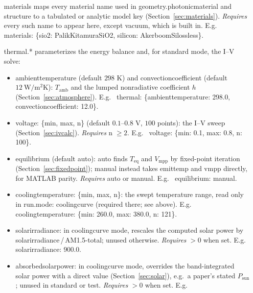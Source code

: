 \documentclass[11pt,a4paper,twoside]{article}
\DeclareRobustCommand{\code}[1]{\begingroup\upshape\ttfamily
  \def\_{\allowbreak\textunderscore\allowbreak}#1\endgroup}
\begin{document}
\code{materials} maps every material name used in
\code{geometry.photonic\_material} and \code{structure} to a tabulated or
analytic model key (Section~\ref{sec:materials}). \textit{Requires} every
such name to appear here, except \code{vacuum}, which is built in. E.g.\
\code{materials: \{sio2: PalikKitamura\_SiO2, silicon:
Akerboom\_Si\_lossless\}}.

\code{thermal.*} parameterizes the energy balance and, for \code{standard}
mode, the I--V solve:

\begin{itemize}
  \item \code{ambient\_temperature} (default \(298\) K) and
        \code{convection\_coefficient} (default \(12\ \mathrm{W/m^2K}\)):
        \(T_{\mathrm{amb}}\) and the lumped nonradiative coefficient \(h\)
        (Section~\ref{sec:atmosphere}). E.g.\
        \code{thermal: \{ambient\_temperature: 298.0,
        convection\_coefficient: 12.0\}}.
  \item \code{voltage: \{min, max, n\}} (default \(0.1\)--\(0.8\) V,
        \(100\) points): the I--V sweep (Section~\ref{sec:ivcalc}).
        \textit{Requires} \code{n} \(\geq 2\). E.g.\
        \code{voltage: \{min: 0.1, max: 0.8, n: 100\}}.
  \item \code{equilibrium} (default \code{auto}): \code{auto} finds
        \(T_{\mathrm{eq}}\) and \(V_{\mathrm{mpp}}\) by fixed-point iteration
        (Section~\ref{sec:fixedpoint}); \code{manual} instead takes
        \code{emit\_temp} and \code{vmpp} directly, for MATLAB parity.
        \textit{Requires} \code{auto} or \code{manual}. E.g.\
        \code{equilibrium: manual}.
  \item \code{cooling\_temperature: \{min, max, n\}}: the swept temperature
        range, read only in \code{run.mode: cooling\_curve} (required there;
        see above). E.g.\
        \code{cooling\_temperature: \{min: 260.0, max: 380.0, n: 121\}}.
  \item \code{solar\_irradiance}: in \code{cooling\_curve} mode, rescales
        the computed solar power by \code{solar\_irradiance}\,/\,AM1.5-total;
        unused otherwise. \textit{Requires} \(>0\) when set. E.g.\
        \code{solar\_irradiance: 900.0}.
  \item \code{absorbed\_solar\_power}: in \code{cooling\_curve} mode,
        overrides the band-integrated solar power with a direct value
        (Section~\ref{sec:solar}), e.g.\ a paper's stated
        \(P_{\mathrm{sun}}\); unused in \code{standard} or \code{test}.
        \textit{Requires} \(>0\) when set. E.g.\

\end{itemize}
\end{document}
